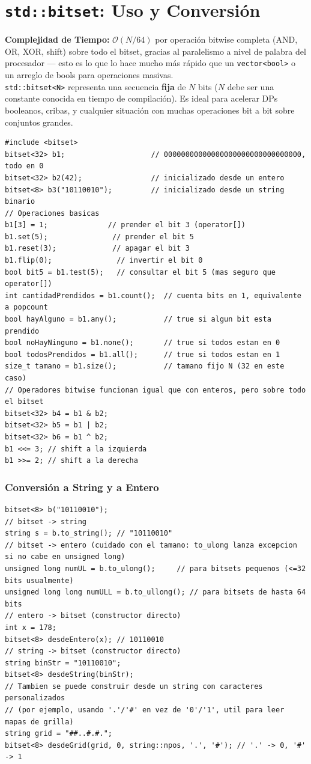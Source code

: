\documentclass[10pt,twocolumn,letterpaper]{report}
\begin{document}
\section{\texttt{std::bitset}: Uso y Conversión}
\textbf{Complejidad de Tiempo:} $\mathcal{O}(N/64)$ por operación bitwise completa (AND, OR, XOR, shift) sobre todo el bitset, gracias al paralelismo a nivel de palabra del procesador — esto es lo que lo hace mucho más rápido que un \texttt{vector<bool>} o un arreglo de bools para operaciones masivas. \\
\texttt{std::bitset<N>} representa una secuencia \textbf{fija} de $N$ bits ($N$ debe ser una constante conocida en tiempo de compilación). Es ideal para acelerar DPs booleanos, cribas, y cualquier situación con muchas operaciones bit a bit sobre conjuntos grandes.
\begin{lstlisting}
#include <bitset>
bitset<32> b1;                    // 00000000000000000000000000000000, todo en 0
bitset<32> b2(42);                // inicializado desde un entero
bitset<8> b3("10110010");         // inicializado desde un string binario
// Operaciones basicas
b1[3] = 1;              // prender el bit 3 (operator[])
b1.set(5);               // prender el bit 5
b1.reset(3);             // apagar el bit 3
b1.flip(0);               // invertir el bit 0
bool bit5 = b1.test(5);   // consultar el bit 5 (mas seguro que operator[])
int cantidadPrendidos = b1.count();  // cuenta bits en 1, equivalente a popcount
bool hayAlguno = b1.any();           // true si algun bit esta prendido
bool noHayNinguno = b1.none();       // true si todos estan en 0
bool todosPrendidos = b1.all();      // true si todos estan en 1
size_t tamano = b1.size();           // tamano fijo N (32 en este caso)
// Operadores bitwise funcionan igual que con enteros, pero sobre todo el bitset
bitset<32> b4 = b1 & b2;
bitset<32> b5 = b1 | b2;
bitset<32> b6 = b1 ^ b2;
b1 <<= 3; // shift a la izquierda
b1 >>= 2; // shift a la derecha
\end{lstlisting}
\subsubsection{Conversión a String y a Entero}
\begin{lstlisting}
bitset<8> b("10110010");
// bitset -> string
string s = b.to_string(); // "10110010"
// bitset -> entero (cuidado con el tamano: to_ulong lanza excepcion si no cabe en unsigned long)
unsigned long numUL = b.to_ulong();     // para bitsets pequenos (<=32 bits usualmente)
unsigned long long numULL = b.to_ullong(); // para bitsets de hasta 64 bits
// entero -> bitset (constructor directo)
int x = 178;
bitset<8> desdeEntero(x); // 10110010
// string -> bitset (constructor directo)
string binStr = "10110010";
bitset<8> desdeString(binStr);
// Tambien se puede construir desde un string con caracteres personalizados
// (por ejemplo, usando '.'/'#' en vez de '0'/'1', util para leer mapas de grilla)
string grid = "##..#.#.";
bitset<8> desdeGrid(grid, 0, string::npos, '.', '#'); // '.' -> 0, '#' -> 1
\end{lstlisting}
\end{document}
